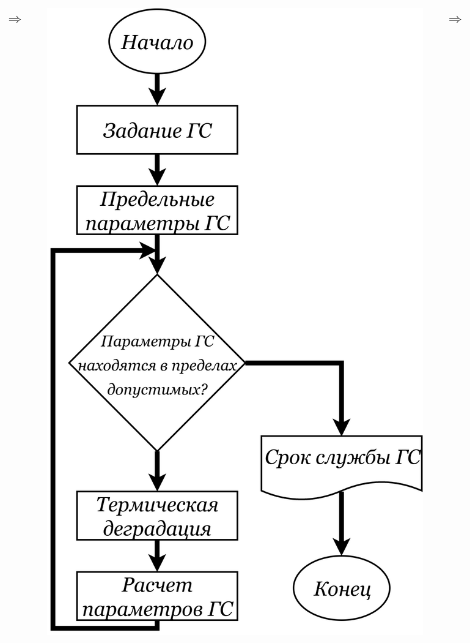 \documentclass[10pt,pdf,hyperref={unicode},aspectratio={169}]{beamer}
\begin{document}
\begin{frame}
\begin{columns}
\begin{center}
		\end{center}
		\Huge{$\Rightarrow$}
		\begin{center}
			\includegraphics[width=\textwidth]{assets/AlgWrk}
		\end{center}
		\Huge{$\Rightarrow$}
		\begin{center}

\end{center}
\end{columns}
\end{frame}
\end{document}
